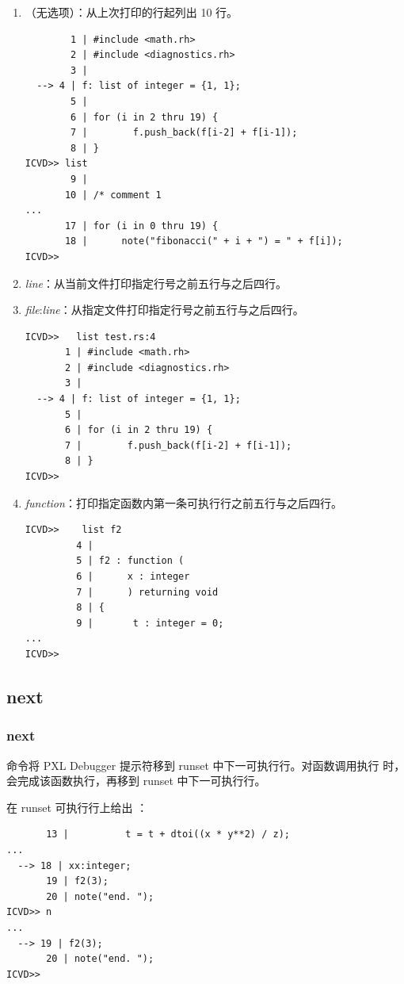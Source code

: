 \begin{enumerate}
  \item {}（无选项）：从上次打印的行起列出 10 行。
\begin{lstlisting}
        1 | #include <math.rh>
        2 | #include <diagnostics.rh>
        3 |
  --> 4 | f: list of integer = {1, 1};
        5 |
        6 | for (i in 2 thru 19) {
        7 |        f.push_back(f[i-2] + f[i-1]);
        8 | }
ICVD>> list
        9 |
       10 | /* comment 1
...
       17 | for (i in 0 thru 19) {
       18 |      note("fibonacci(" + i + ") = " + f[i]);
ICVD>>
\end{lstlisting}

  \item {} \textit{line}：从当前文件打印指定行号之前五行与之后四行。

  \item {} \textit{file}:\textit{line}：从指定文件打印指定行号之前五行与之后四行。
\begin{lstlisting}
ICVD>>   list test.rs:4
       1 | #include <math.rh>
       2 | #include <diagnostics.rh>
       3 |
  --> 4 | f: list of integer = {1, 1};
       5 |
       6 | for (i in 2 thru 19) {
       7 |        f.push_back(f[i-2] + f[i-1]);
       8 | }
ICVD>>
\end{lstlisting}

  \item {} \textit{function}：打印指定函数内第一条可执行行之前五行与之后四行。
\begin{lstlisting}
ICVD>>    list f2
         4 |
         5 | f2 : function (
         6 |      x : integer
         7 |      ) returning void
         8 | {
         9 |       t : integer = 0;
...
ICVD>>
\end{lstlisting}
\end{enumerate}

\subsection{next}
\subsubsection*{next}

 命令将 PXL Debugger 提示符移到 runset 中下一可执行行。对函数调用执行  时，会完成该函数执行，再移到 runset 中下一可执行行。

在 runset 可执行行上给出 ：
\begin{lstlisting}
       13 |          t = t + dtoi((x * y**2) / z);
...
  --> 18 | xx:integer;
       19 | f2(3);
       20 | note("end. ");
ICVD>> n
...
  --> 19 | f2(3);
       20 | note("end. ");
ICVD>>
\end{lstlisting}

